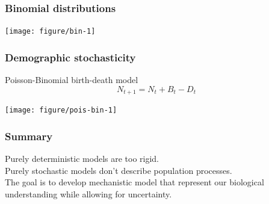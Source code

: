 \documentclass[color=usenames,dvipsnames]{beamer}\usepackage[]{graphicx}\usepackage[]{xcolor}
\newenvironment{knitrout}{}{} %
\begin{document}
\begin{frame}[fragile]
  \frametitle{Binomial distributions}
\begin{knitrout}
\color{fgcolor}

{\centering \texttt{[image: figure/bin-1]} 

}


\end{knitrout}
\end{frame}


\begin{frame}[fragile]
  \frametitle{Demographic stochasticity}
  Poisson-Binomial birth-death model \\
  \[
     N_{t+1} = N_t + B_t - D_t
  \]
\begin{knitrout}
\color{fgcolor}

{\centering \texttt{[image: figure/pois-bin-1]} 

}


\end{knitrout}
\end{frame}


\begin{frame}
  \frametitle{Summary}
  \Large
  Purely deterministic models are too rigid. \\
  \vfill
  Purely stochastic models don't describe population processes. \\
  \vfill
  The goal is to develop mechanistic model that represent 
  our biological understanding while allowing for uncertainty. \\
\end{frame}










\end{document}
